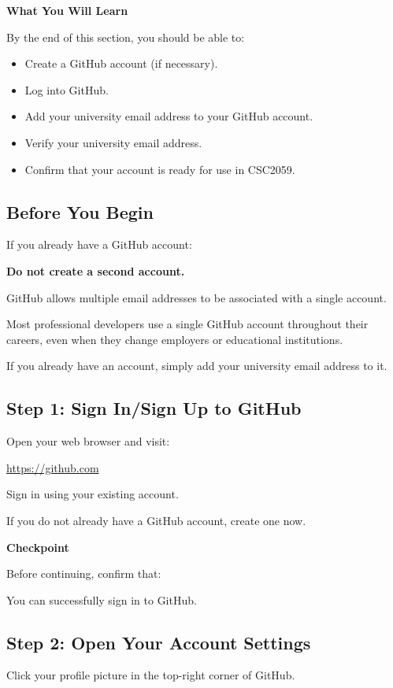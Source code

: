 \documentclass{csc2059practical}
\begin{document}
\begin{learningoutcomes}
\textbf{What You Will Learn}\par
\medskip
By the end of this section, you should be able to:

\begin{itemize}
  \item Create a GitHub account (if necessary).
  \item Log into GitHub.
  \item Add your university email address to your GitHub account.
  \item Verify your university email address.
  \item Confirm that your account is ready for use in CSC2059.
\end{itemize}
\end{learningoutcomes}
\subsection{Before You Begin}
If you already have a GitHub account:

\textbf{Do not create a second account.}

GitHub allows multiple email addresses to be associated with a single account.

Most professional developers use a single GitHub account throughout their careers, even when they change employers or educational institutions.

If you already have an account, simply add your university email address to it.

\subsection{Step 1: Sign In/Sign Up to GitHub}
Open your web browser and visit:

\url{https://github.com}

Sign in using your existing account.

If you do not already have a GitHub account, create one now.

\begin{reflectionbox}
\textbf{Checkpoint}\par
\medskip
Before continuing, confirm that:

You can successfully sign in to GitHub.
\end{reflectionbox}
\subsection{Step 2: Open Your Account Settings}
Click your profile picture in the top-right corner of GitHub.
\end{document}
